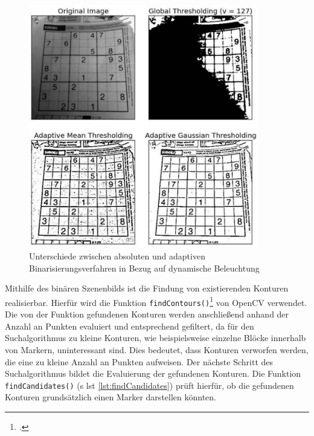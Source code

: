 \begin{figure}[H]
\centering
\includegraphics[width=10cm]{Bilder/Implementierung/AdaptiveThresholding.jpg}
\caption[Unterschiede zwischen absoluten und adaptiven Binarisierungsverfahren in Bezug auf dynamische Beleuchtung]{Unterschiede zwischen absoluten und adaptiven Binarisierungsverfahren in Bezug auf dynamische Beleuchtung\protect\footnotemark}
\label{fig:AdaptiveThresholding}
\end{figure}

\noindent Mithilfe des binären Szenenbilds ist die Findung von existierenden Konturen realisierbar. Hierfür wird die Funktion \texttt{findContours()}\footcite{opencvfindContours} von OpenCV verwendet. Die von der Funktion gefundenen Konturen werden anschließend anhand der Anzahl an Punkten evaluiert und entsprechend gefiltert, da für den Suchalgorithmus zu kleine Konturen, wie beispielsweise einzelne Blöcke innerhalb von Markern, uninteressant sind. Dies bedeutet, dass Konturen verworfen werden, die eine zu kleine Anzahl an Punkten aufweisen. Der nächste Schritt des Suchalgorithmus bildet die Evaluierung der gefundenen Konturen. Die Funktion \texttt{findCandidates()} (\acs{s} \acs{lst} \ref{lst:findCandidates}) prüft hierfür, ob die gefundenen Konturen grundsätzlich einen Marker darstellen könnten.

